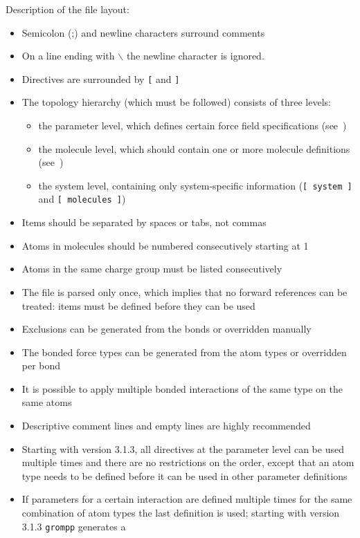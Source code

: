 Description of the file layout:
\begin{itemize}
\item Semicolon (;) and newline characters surround comments
\item On a line ending with $\backslash$ the newline character is ignored.
\item Directives are surrounded by {\tt [} and {\tt ]}
\item The topology hierarchy (which must be followed) consists of three levels:
\begin{itemize}
\item the parameter level, which defines certain force field specifications 
      (see~)
\item the molecule level, which should contain one or more molecule
      definitions (see~)
\item the system level, containing only system-specific information 
      ({\tt [~system~]} and {\tt [~molecules~]})
\end{itemize}
\item Items should be separated by spaces or tabs, not commas
\item Atoms in molecules should be numbered consecutively starting at 1
\item Atoms in the same charge group must be listed consecutively
\item The file is parsed only once, which implies that no forward
      references can be treated: items must be defined before they
      can be used
\item Exclusions can be generated from the bonds or
      overridden manually
\item The bonded force types can be generated from the atom types or
      overridden per bond
\item It is possible to apply multiple bonded interactions of the same type
      on the same atoms
\item Descriptive comment lines and empty lines are highly recommended
\item Starting with {\gromacs} version 3.1.3, all directives at the
      parameter level can be used multiple times and there are no
      restrictions on the order, except that an atom type needs to be
      defined before it can be used in other parameter definitions
\item If parameters for a certain interaction are defined multiple times
      for the same combination of atom types the last definition is used;
      starting with {\gromacs} version 3.1.3 {\tt grompp} generates a

\end{itemize}
